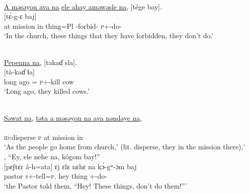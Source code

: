 \ea \label{ex:8:17}\\
\underline{A  məsəyon  ava  na}  \underline{ele  ahay  aməwəsle  na},  [tége  bay].\\
\gll  {}                       [t\'{ɛ}-g-ɛ     baj]\\
      at  mission  in  {\PSP}  thing=Pl   {\DEP}-forbid-{\CL}  {\PSP}    \textsc{p}+{\IFV}-do-{\CL}  {\NEG}\\
\glt  ‘In the church, these things that they have forbidden, they don’t do.’
\z


\ea \label{ex:8:18}\\
\underline{Pepenna  na},  [takaɗ  sla].\\
\gll  {}         [tà-kaɗ     ɬa]\\
      {long ago} ={\ADV}  {\PSP}    \textsc{p}+{\PFV}-kill  cow \\
\glt  ‘Long ago, they killed cows.’
\z


\ea \label{ex:8:19}\\
\uline{Səwat  na},  \uline{təta  a  məsəyon  na  ava  nəndəye  na},\\ 
\gll  {}                        \\
      \textsc{id}:disperse  {\PSP}  \textsc{p} at  mission  {\PSP}    in  {\DEM}  {\PSP}\\
\glt  ‘As the people go home from church,' (lit. disperse, they in the mission there),’\\
,   “Ey, ele  nehe  na,  kógom  bay!”\\
\gll  {}[{pɛʃtɛr} {á-h}{=ata}] {ɛj} {ɛlɛ} {nɛhɛ} {na} {k\'{ɔ}-gʷ{}-ɔm} {baj}\\
      pastor  \textsc{s}+{\IFV}-tell=\textsc{p}.{\IO}   hey    thing  {\DEM}  {\PSP}  +{\IFV}-do-{\twoP}    {\NEG}\\
\glt  ‘the Pastor told them, “Hey! These things, don’t do them!”’
\z


